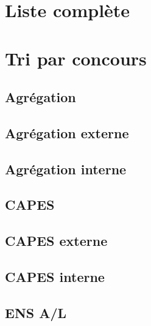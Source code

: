 \documentclass[a4paper,12pt]{article}
\begin{document}
\newpage

\tableofcontents

\newpage

\section{Liste complète}
\label{sec:org39e5b6e}

\noindent

\section{Tri par concours}
\label{sec:orgede0c79}

\subsection{Agrégation}
\label{sec:orgf0fa48b}

\noindent


\subsection{Agrégation externe}
\label{sec:orgde99a47}

\noindent


\subsection{Agrégation interne}
\label{sec:orga28676e}

\noindent


\subsection{CAPES}
\label{sec:org6914e32}

\noindent


\subsection{CAPES externe}
\label{sec:org3b54b6b}

\noindent


\subsection{CAPES interne}
\label{sec:orgfc50157}

\noindent


\subsection{ENS A​/​L}
\label{sec:orgb26ad69}
\end{document}
